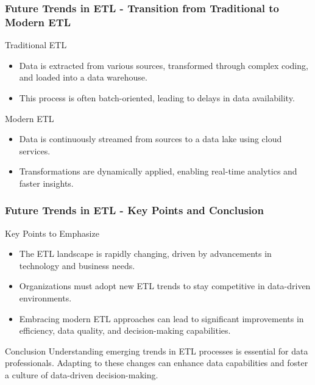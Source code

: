 \documentclass[aspectratio=169]{beamer}
\begin{document}
\begin{frame}[fragile]
    \frametitle{Future Trends in ETL - Transition from Traditional to Modern ETL}
    \begin{block}{Traditional ETL}
        \begin{itemize}
            \item Data is extracted from various sources, transformed through complex coding, and loaded into a data warehouse.
            \item This process is often batch-oriented, leading to delays in data availability.
        \end{itemize}
    \end{block}
    
    \begin{block}{Modern ETL}
        \begin{itemize}
            \item Data is continuously streamed from sources to a data lake using cloud services.
            \item Transformations are dynamically applied, enabling real-time analytics and faster insights.
        \end{itemize}
    \end{block}
\end{frame}

\begin{frame}[fragile]
    \frametitle{Future Trends in ETL - Key Points and Conclusion}
    \begin{block}{Key Points to Emphasize}
        \begin{itemize}
            \item The ETL landscape is rapidly changing, driven by advancements in technology and business needs.
            \item Organizations must adopt new ETL trends to stay competitive in data-driven environments.
            \item Embracing modern ETL approaches can lead to significant improvements in efficiency, data quality, and decision-making capabilities.
        \end{itemize}
    \end{block}

    \begin{block}{Conclusion}
        Understanding emerging trends in ETL processes is essential for data professionals. 
        Adapting to these changes can enhance data capabilities and foster a culture of data-driven decision-making.
    \end{block}
\end{frame}
\end{document}
